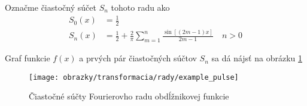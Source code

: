 \begin{priklad}
    Označme čiastočný súčet $S_n$ tohoto radu ako 
    \begin{equation*}
    \begin{split}
        S_0(x) &= \frac{1}{2} \\
        S_n(x) &= \frac{1}{2} + \frac{2}{\pi} \sum_{m=1}^{n}
                \frac{\sin\left[ (2m-1) x\right]}{2m-1} \quad n>0
    \end{split}
    \end{equation*}
    
    Graf funkcie $f(x)$ a prvých pár čiastočných súčtov $S_n$ sa dá
    nájsť na obrázku \ref{fig:example_pulse}

    \begin{figure}[htp]
        \centering
        \texttt{[image: obrazky/transformacia/rady/example\_pulse]}
        \caption{Čiastočné súčty Fourierovho radu obdĺžnikovej funkcie}
        \label{fig:example_pulse}
    \end{figure}    
    \label{priklad:fourier_series_rect}
\end{priklad}

